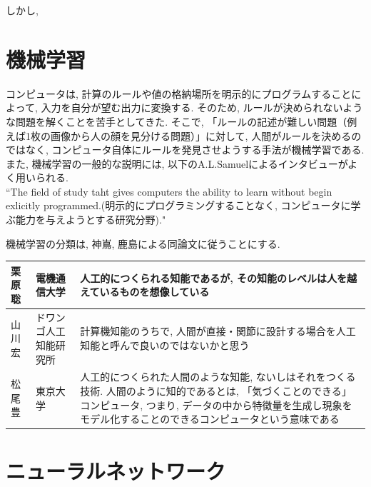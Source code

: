 \documentclass{suribt}
\begin{document}
しかし, 



\section{機械学習}
コンピュータは, 計算のルールや値の格納場所を明示的にプログラムすることによって, 入力を自分が望む出力に変換する. そのため, ルールが決められないような問題を解くことを苦手としてきた. そこで, 「ルールの記述が難しい問題（例えば1枚の画像から人の顔を見分ける問題）」に対して, 人間がルールを決めるのではなく, コンピュータ自体にルールを発見させようする手法が機械学習である. また, 機械学習の一般的な説明には, 以下のA.L.Samuelによるインタビューがよく用いられる\cite{Kamishima-2019}.\\
``The field of study taht gives computers the ability to learn without begin exlicitly programmed.(明示的にプログラミングすることなく, コンピュータに学ぶ能力を与えようとする研究分野)."

機械学習の分類は, 神嶌, 鹿島による同論文に従うことにする. 

\begin{table}[htb]
	\begin{tabular}{l|l|p{7cm}}
		\hline
		栗原聡 & 電機通信大学 & 人工的につくられる知能であるが, その知能のレベルは人を越えているものを想像している \\ \hline
		山川宏 & ドワンゴ人工知能研究所 & 計算機知能のうちで, 人間が直接・関節に設計する場合を人工知能と呼んで良いのではないかと思う \\ \hline
		松尾豊 & 東京大学 & 人工的につくられた人間のような知能, ないしはそれをつくる技術. 人間のように知的であるとは, 「気づくことのできる」コンピュータ, つまり, データの中から特徴量を生成し現象をモデル化することのできるコンピュータという意味である \\
		\hline
	\end{tabular}
\end{table}


\section{ニューラルネットワーク}



\end{document}
